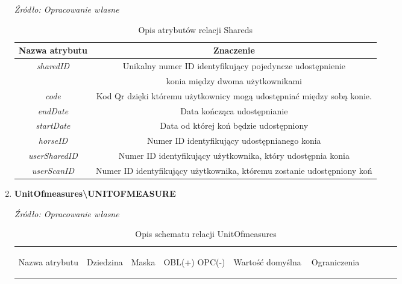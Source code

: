 \documentclass[12pt,twoside]{report}
\begin{document}
\begin{enumerate}[start=10,label={\bfseries REL\textbackslash\arabic*}]
	\begin{table}[H]
		\caption{Opis atrybutów relacji Shareds}
		\textit{Źródło: Opracowanie własne}
		\label{SharedsAttributeDescription}
		\centering
		\begin{tabular}{|c|c|}
			\hline
			Nazwa atrybutu & Znaczenie \\
			\hline			
			\textit{sharedID}&Unikalny numer ID identyfikujący pojedyncze udostępnienie \\
			& konia między dwoma użytkownikami\\
			\hline			
			\textit{code}& Kod Qr dzięki któremu użytkownicy mogą udostępniać między sobą konie.\\				
			\hline			
			\textit{endDate}& Data kończąca udostępnianie\\
			\hline			
			\textit{startDate}& Data od której koń będzie udostępniony\\				
			\hline
			\textit{horseID}&Numer ID identyfikujący udostępnianego konia\\				
			\hline
			\textit{userSharedID}& Numer ID identyfikujący użytkownika, który udostępnia konia \\				
			\hline
			\textit{userScanID}&Numer ID identyfikujący użytkownika, któremu zostanie udostępniony koń\\	
			\hline
		\end{tabular}
	\end{table}
	\item \textbf{UnitOfmeasures\textbackslash UNITOFMEASURE}
	 \begin{table}[H]
		\caption{Opis schematu relacji UnitOfmeasures}
		\textit{Źródło: Opracowanie własne}
		\label{UnitOfmeasuresRelationSchema}
		\centering
		\begin{tabular}{|c|c|c|c|c|c|c|c|c|c|}
			\hline
			\begin{sideways}Nazwa atrybutu\end{sideways}& 
			\begin{sideways}Dziedzina \end{sideways}& 
			\begin{sideways}Maska \end{sideways}& 
			\begin{sideways}OBL(+) OPC(-)\end{sideways} & 
			\begin{sideways}Wartość domyślna$\ $\end{sideways}& 
			\begin{sideways}Ograniczenia\end{sideways} &

\end{tabular}
\end{table}
\end{enumerate}
\end{document}
